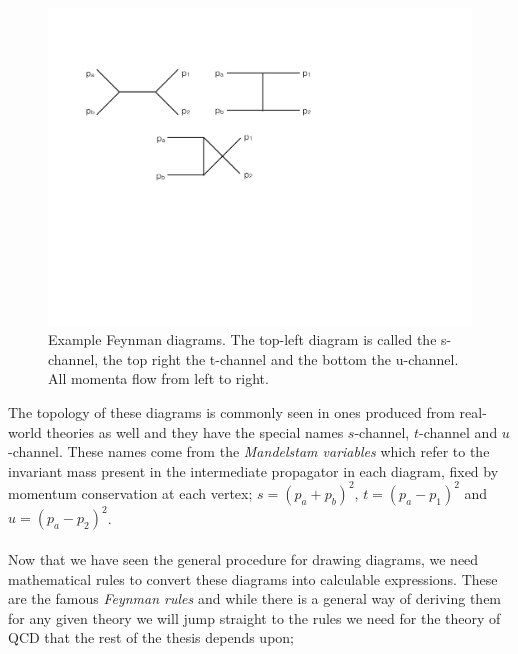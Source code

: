 \begin{figure}[t]
\centering
\includegraphics[scale=0.6]{Images/feyndiags.pdf} 
\caption{Example Feynman diagrams. The top-left diagram is called the s-channel, the top right the t-channel and the bottom the u-channel. All momenta flow from left to right.}
\label{fig:feyndiags}
\end{figure}

The topology of these diagrams is commonly seen in ones produced from real-world theories as well and they have the special names $s$-channel, $t$-channel and $u$-channel. These names come from the \emph{Mandelstam variables} which refer to the invariant mass  present in the intermediate propagator in each diagram, fixed by momentum conservation at each vertex; $s = (p_a + p_b)^2$, $t = (p_a - p_1)^2$ and $u = (p_a - p_2)^2$. \\
\\
Now that we have seen the general procedure for drawing diagrams, we need mathematical rules to convert these diagrams into calculable expressions. These are the famous \emph{Feynman rules} and while there is a general way of deriving them for any given theory we will jump straight to the rules we need for the theory of QCD that the rest of the thesis depends upon; 

